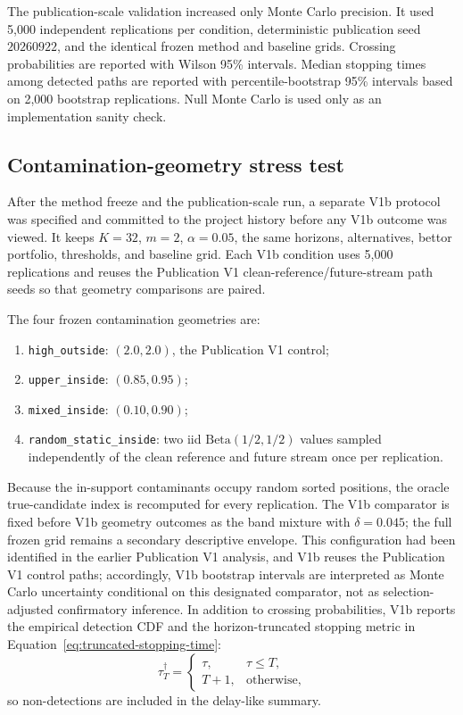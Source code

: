 The publication-scale validation increased only Monte Carlo precision. It used 5,000 independent replications per condition, deterministic publication seed \(20260922\), and the identical frozen method and baseline grids. Crossing probabilities are reported with Wilson 95\% intervals. Median stopping times among detected paths are reported with percentile-bootstrap 95\% intervals based on 2,000 bootstrap replications. Null Monte Carlo is used only as an implementation sanity check.

\subsection{Contamination-geometry stress test}

After the method freeze and the publication-scale run, a separate V1b protocol was specified and committed to the project history before any V1b outcome was viewed. It keeps \(K=32\), \(m=2\), \(\alpha=0.05\), the same horizons, alternatives, bettor portfolio, thresholds, and baseline grid. Each V1b condition uses 5,000 replications and reuses the Publication V1 clean-reference/future-stream path seeds so that geometry comparisons are paired.

The four frozen contamination geometries are:
\begin{enumerate}[leftmargin=*]
  \item \texttt{high\_outside}: \((2.0,2.0)\), the Publication V1 control;
  \item \texttt{upper\_inside}: \((0.85,0.95)\);
  \item \texttt{mixed\_inside}: \((0.10,0.90)\);
  \item \texttt{random\_static\_inside}: two iid \(\mathrm{Beta}(1/2,1/2)\) values sampled independently of the clean reference and future stream once per replication.
\end{enumerate}

Because the in-support contaminants occupy random sorted positions, the oracle true-candidate index is recomputed for every replication. The V1b comparator is fixed before V1b geometry outcomes as the band mixture with \(\delta=0.045\); the full frozen grid remains a secondary descriptive envelope. This configuration had been identified in the earlier Publication V1 analysis, and V1b reuses the Publication V1 control paths; accordingly, V1b bootstrap intervals are interpreted as Monte Carlo uncertainty conditional on this designated comparator, not as selection-adjusted confirmatory inference. In addition to crossing probabilities, V1b reports the empirical detection CDF and the horizon-truncated stopping metric in Equation~\eqref{eq:truncated-stopping-time}:
\begin{equation}
\tau_T^\dagger
  =
  \begin{cases}
  \tau,&\tau\le T,\\
  T+1,&\text{otherwise},
  \end{cases}
  \label{eq:truncated-stopping-time}
\end{equation}
so non-detections are included in the delay-like summary.

